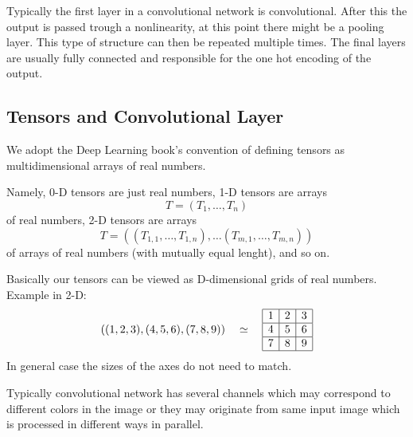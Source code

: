 \documentclass[]{article}
\begin{document}
Typically the first layer in a convolutional network is convolutional. After this
the output is passed trough a nonlinearity, at this point there might be a pooling
layer. This type of structure can then be repeated multiple times. The final layers
are usually fully connected and responsible for the one hot encoding of the output.


\subsection{Tensors and Convolutional Layer}
We adopt the Deep Learning book's convention of defining tensors as
multidimensional arrays of real numbers.

Namely, 0-D tensors are just real numbers, 1-D tensors are arrays
\[
T = (T_1, \ldots, T_n)
\]
of real numbers, 2-D tensors are arrays
\[
T = ((T_{1,1}, \ldots, T_{1,n}), \ldots (T_{m,1}, \ldots, T_{m,n}))
\]
of arrays of real numbers (with mutually equal lenght), and so on.

Basically our tensors can be viewed as D-dimensional grids of real numbers.
Example in 2-D:
\[
((1, 2, 3), (4, 5, 6), (7, 8, 9)) \quad \simeq \quad
\begin{array}{|c|c|c|}
  \hline
  1 & 2 & 3 \\
  \hline
  4 & 5 & 6 \\
  \hline
  7 & 8 & 9 \\
  \hline
 \end{array}
\]
In general case the sizes of the axes do not need to match.


Typically convolutional network has several channels which may correspond to different
colors in the image or they may originate from same input image which is processed
in different ways in parallel.
\end{document}
